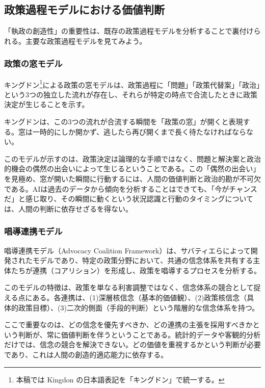 \documentclass{keikaku}
\begin{document}
\subsection{政策過程モデルにおける価値判断}

「執政の創造性」の重要性は、既存の政策過程モデルを分析することで裏付けられる。主要な政策過程モデルを見てみよう。

\subsubsection{政策の窓モデル}

キングドン\footnote{本稿では Kingdon の日本語表記を「キングドン」で統一する。}による政策の窓モデルは、政策過程に「問題」「政策代替案」「政治」という3つの独立した流れが存在し、それらが特定の時点で合流したときに政策決定が生じることを示す\cite{kingdon1984}\cite{kusano1997}。

キングドンは、この3つの流れが合流する瞬間を「政策の窓」が開くと表現する。窓は一時的にしか開かず、逃したら再び開くまで長く待たなければならない。

このモデルが示すのは、政策決定は論理的な手順ではなく、問題と解決案と政治的機会の偶然の出会いによって生じるということである。この「偶然の出会い」を見極め、窓が開いた瞬間に行動するには、人間の価値判断と政治的勘が不可欠である。AIは過去のデータから傾向を分析することはできても、「今がチャンスだ」と感じ取り、その瞬間に動くという状況認識と行動のタイミングについては、人間の判断に依存せざるを得ない。

\subsubsection{唱導連携モデル}

唱導連携モデル（Advocacy Coalition Framework）は、サバティエらによって開発されたモデルであり、特定の政策分野において、共通の信念体系を共有する主体たちが連携（コアリション）を形成し、政策を唱導するプロセスを分析する\cite{sabatier1988}。

このモデルの特徴は、政策を単なる利害調整ではなく、信念体系の競合として捉える点にある。各連携は、(1)深層核信念（基本的価値観）、(2)政策核信念（具体的政策目標）、(3)二次的側面（手段的判断）という階層的な信念体系を持つ。

ここで重要なのは、どの信念を優先すべきか、どの連携の主張を採用すべきかという判断が、常に価値判断を伴うということである。統計的データや客観的分析だけでは、信念の競合を解決できない。どの価値を重視するかという判断が必要であり、これは人間の創造的適応能力に依存する。
\end{document}
